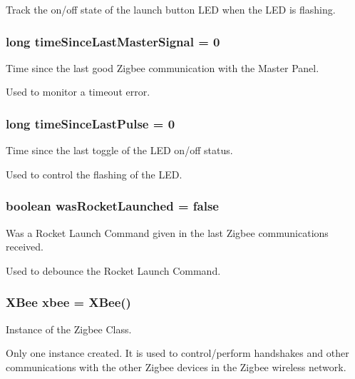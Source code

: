 \-Track the on/off state of the launch button \-L\-E\-D when the \-L\-E\-D is flashing. 

\hypertarget{launchPad_8ino_a7b1a52e134926e2cf15a07a282da0357}{
\subsubsection[{time\-Since\-Last\-Master\-Signal}]{\setlength{\rightskip}{0pt plus 5cm}long {\bf time\-Since\-Last\-Master\-Signal} = 0}}\label{launchPad_8ino_a7b1a52e134926e2cf15a07a282da0357}


\-Time since the last good \-Zigbee communication with the \-Master \-Panel. 

\-Used to monitor a timeout error. \hypertarget{launchPad_8ino_af8d9d76d18b6aee4b209d4f3b9f2d8d3}{
\subsubsection[{time\-Since\-Last\-Pulse}]{\setlength{\rightskip}{0pt plus 5cm}long {\bf time\-Since\-Last\-Pulse} = 0}}\label{launchPad_8ino_af8d9d76d18b6aee4b209d4f3b9f2d8d3}


\-Time since the last toggle of the \-L\-E\-D on/off status. 

\-Used to control the flashing of the \-L\-E\-D. \hypertarget{launchPad_8ino_af8ca6213dcf51fb6a3a9453c59099449}{
\subsubsection[{was\-Rocket\-Launched}]{\setlength{\rightskip}{0pt plus 5cm}boolean {\bf was\-Rocket\-Launched} = false}}\label{launchPad_8ino_af8ca6213dcf51fb6a3a9453c59099449}


\-Was a \-Rocket \-Launch \-Command given in the last \-Zigbee communications received. 

\-Used to debounce the \-Rocket \-Launch \-Command. \hypertarget{launchPad_8ino_a18bbd7dece9ef587254b08710426fd17}{
\subsubsection[{xbee}]{\setlength{\rightskip}{0pt plus 5cm}\-X\-Bee {\bf xbee} = \-X\-Bee()}}\label{launchPad_8ino_a18bbd7dece9ef587254b08710426fd17}


\-Instance of the \-Zigbee \-Class. 

\-Only one instance created. \-It is used to control/perform handshakes and other communications with the other \-Zigbee devices in the \-Zigbee wireless network. 